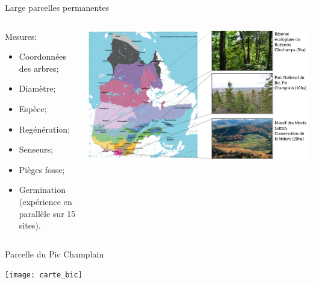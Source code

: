 \documentclass{eecslides}
\begin{document}
	\begin{frame}{Large parcelles permanentes}
		\begin{columns}
			\begin{column}{0.35\textwidth}
			Mesures:
				\begin{itemize}
					\item Coordonnées des arbres;
					\item Diamètre;
					\item Espèce;			
					\item Regénération;
					\item Senseurs;
					\item Pièges fosse;
					\item Germination (expérience en parallèle sur 15 sites).
				\end{itemize}
			\end{column}	
			\begin{column}{0.65\textwidth}
				\begin{center}
					\includegraphics[height=0.5\textheight]{carte_parcelles}
				\end{center}
			\end{column}
		\end{columns}	    	
	\end{frame}


	\begin{frame}{Parcelle du Pic Champlain}
				\begin{center}
					\texttt{[image: carte\_bic]}
				\end{center}
	\end{frame}

\end{document}
